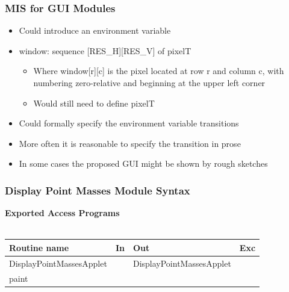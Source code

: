 \documentclass[t,12pt,numbers,fleqn]{beamer}
\begin{document}

\begin{frame}
\frametitle{MIS for GUI Modules}

\begin{itemize}
\item Could introduce an environment variable
\item window: sequence [RES\_H][RES\_V] of pixelT
\begin{itemize}
\item Where window[r][c] is the pixel located at row r and column c, with numbering zero-relative and beginning at the
upper left corner
\item Would still need to define pixelT
\end{itemize}
\item Could formally specify the environment variable transitions
\item More often it is reasonable to specify the transition in prose
\item In some cases the proposed GUI might be shown by rough sketches
\end{itemize}

\end{frame}


\begin{frame}
\frametitle{Display Point Masses Module Syntax}

\textbf{Exported Access Programs}\\
~\newline
\begin{tabular}{| l | l | l | l |}
\hline
\textbf{Routine name} & \textbf{In} & \textbf{Out} & \textbf{Exc}\\
\hline
DisplayPointMassesApplet & ~ & DisplayPointMassesApplet & ~\\
\hline
paint & ~ & ~ & ~\\
\hline
\end{tabular}

\end{frame}

\end{document}
